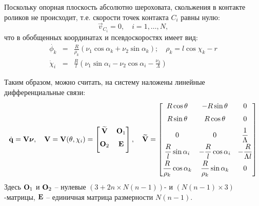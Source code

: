 Поскольку опорная плоскость абсолютно шероховата, скольжения в контакте роликов не происходит, т.е.
скорости точек контакта $C_i$ равны нулю:
\begin{equation}\label{eq:constraints_vec}
    \vec{v}_{C_i} = 0,\quad i = 1,\dots, N,
\end{equation}
что в обобщенных координатах и псевдоскоростях имеет вид:
\begin{eqnarray}
\dot{\phi_k} &=& \frac{R}{\rho_k }(\nu_1\cos\alpha_k + \nu_2\sin\alpha_k); \quad \rho_k  = l\cos\chi_k - r \label{constraint_roller_contact}\\
\dot{\chi}_i &=& \frac{R}{l}(\nu_1\sin\alpha_i - \nu_2\cos\alpha_i - \frac{\nu_3}{\Lambda})\label{constraint_wheel_contact}
\end{eqnarray}

Таким образом, можно считать, на систему наложены линейные дифференциальные связи:
\begin{equation}\label{constraints_V}
    \dot{\boldsymbol{\mathbf{q}}} = \mathbf{V}\boldsymbol{\mathbf{\nu}},\quad \mathbf{V} = \mathbf{V}(\theta,\chi_i) = \begin{bmatrix}
        \widetilde{\mathbf{V}}  & \mathbf{O}_1  \\[6pt]
        \mathbf{O}_2       & \mathbf{E}         \\[6pt]
    \end{bmatrix},
    \quad
    \widetilde{\mathbf{V}} = \begin{bmatrix}
        R\cos\theta                    & -R\sin\theta                    & 0                      \\[6pt]
        R\sin\theta                    &  R\cos\theta                    & 0                      \\[6pt]
        0                              & 0                               & \displaystyle\frac{\displaystyle 1}{\displaystyle \Lambda}    \\[6pt]
        \displaystyle\frac{\displaystyle R}{\displaystyle l}\sin\alpha_i      & -\displaystyle\frac{\displaystyle R}{\displaystyle l}\cos\alpha_i      & -\displaystyle\frac{\displaystyle R}{\displaystyle \Lambda l} \\[6pt]
        \displaystyle\frac{\displaystyle R}{\displaystyle \rho_k}\cos\alpha_k &  \displaystyle\frac{\displaystyle R}{\displaystyle \rho_k}\sin\alpha_k & 0                      \\[6pt]
    \end{bmatrix}
\end{equation}
Здесь $\mathbf{O}_1$ и $\mathbf{O}_2$ -- нулевые $(3+2n \times N(n-1))$- и $(N(n-1) \times 3)$-матрицы, $\mathbf{E}$ -- единичная матрица размерности $N(n-1)$.

